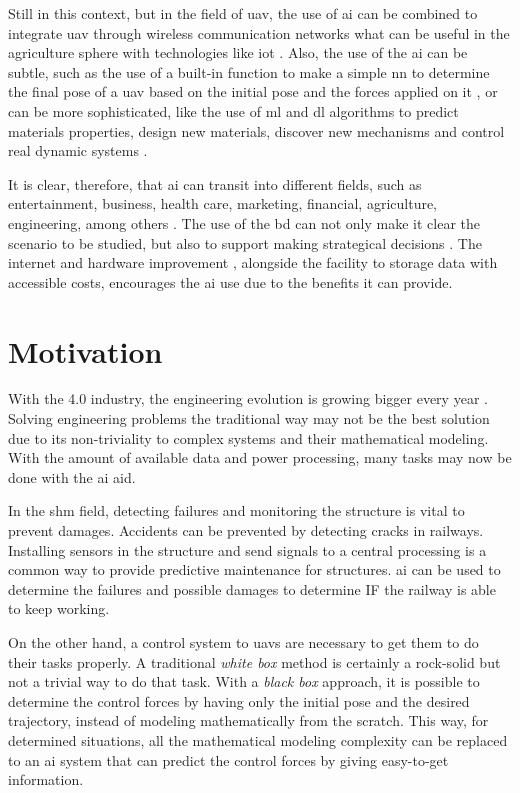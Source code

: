 Still in this context, but in the field of \gls*{uav}, the use of \gls*{ai} can be combined to integrate \gls*{uav} through wireless communication networks \citep{lahmeri2021} what can be useful in the agriculture sphere \citep{ahirwar2019} with technologies like \gls*{iot} \citep{verdouw2016,tzounis2017}.
Also, the use of the \gls*{ai} can be subtle, such as the use of a built-in \matlab function to make a simple \gls*{nn} to determine the final pose of a \gls*{uav} based on the initial pose and the forces applied on it \citep{geronel2023}, or can be more sophisticated, like the use of \gls*{ml} and \gls*{dl} algorithms to predict materials properties, design new materials, discover new mechanisms and control real dynamic systems \citep{guo2021,assilian1974}.

It is clear, therefore, that \gls*{ai} can transit into different fields, such as entertainment, business, health care, marketing, financial, agriculture, engineering, among others \citep{ruiz-real2020,yu2018,davenport2019,verma2021,mhlanga2020,pannu2015,ghatrehsamani2023}. 
The use of the \gls*{bd} can not only make it clear the scenario to be studied, but also to support making strategical decisions \citep{jeble2018,koscielniak2015}.
The internet and hardware improvement \citep{baji2018}, alongside the facility to storage data with accessible costs, encourages the \gls*{ai} use due to the benefits it can provide.

\section{Motivation}

With the 4.0 industry, the engineering evolution is growing bigger every year \citep{meindl2021}.
Solving engineering problems the traditional way may not be the best solution due to its non-triviality to complex systems and their mathematical modeling.
With the amount of available data and power processing, many tasks may now be done with the \gls*{ai} aid.

In the \gls*{shm} field, detecting failures and monitoring the structure is vital to prevent damages. 
Accidents can be prevented by detecting cracks in railways.
Installing sensors in the structure and send signals to a central processing is a common way to provide predictive maintenance for structures.
\gls*{ai} can be used to determine the failures and possible damages to determine IF the railway is able to keep working.

On the other hand, a control system to \glspl*{uav} are necessary to get them to do their tasks properly.
A traditional \emph{white box} method is certainly a rock-solid but not a trivial way to do that task. 
With a \emph{black box} approach, it is possible to determine the control forces by having only the initial pose and the desired trajectory, instead of modeling mathematically from the scratch.
This way, for determined situations, all the mathematical modeling complexity can be replaced to an \gls*{ai} system that can predict the control forces by giving easy-to-get information.

